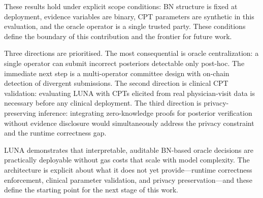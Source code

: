 \documentclass[journal]{IEEEtran}
\begin{document}
These results hold under explicit scope conditions:
BN structure is fixed at deployment, evidence
variables are binary, CPT parameters are synthetic
in this evaluation, and the oracle operator is a
single trusted party. These conditions define the
boundary of this contribution and the frontier for
future work.

Three directions are prioritised. The most
consequential is oracle centralization: a single
operator can submit incorrect posteriors detectable
only post-hoc. The immediate next step is a
multi-operator committee design with on-chain
detection of divergent submissions. The second
direction is clinical CPT validation: evaluating LUNA
with CPTs elicited from real physician-visit data is
necessary before any clinical deployment. The third
direction is privacy-preserving inference: integrating
zero-knowledge proofs for posterior verification
without evidence disclosure would simultaneously
address the privacy constraint and the runtime
correctness gap.

LUNA demonstrates that interpretable, auditable
BN-based oracle decisions are practically deployable
without gas costs that scale with model complexity.
The architecture is explicit about what it does not
yet provide---runtime correctness enforcement,
clinical parameter validation, and privacy
preservation---and these define the starting point
for the next stage of this work.




\end{document}

